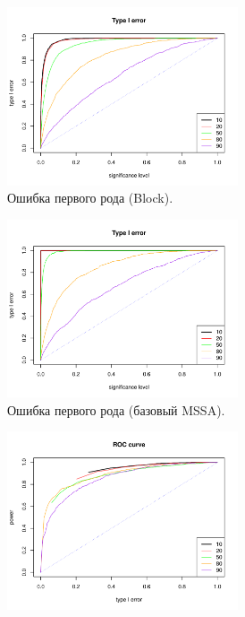 \documentclass[specialist,
substylefile = spbu_report.rtx,
subf,href,colorlinks=true, 12pt]{disser}
\theoremstyle{definition}
\begin{document}
		\begin{figure}
		\captionsetup[subfigure]{justification=Centering}
		\begin{subfigure}[t]{0.45\textwidth}
			\centering
			\includegraphics[width=0.75\textwidth]{type1error_block_fa.pdf}
			\caption{Ошибка первого рода (Block).}
			\label{fig:block_fa_a}
		\end{subfigure}\hspace{\fill}
		\begin{subfigure}[t]{0.45\textwidth}
			\centering
			\includegraphics[width=0.75\textwidth]{type1error_mssa_fa.pdf}
			\caption{Ошибка первого рода (базовый MSSA).}
		\end{subfigure}
		\bigskip
		\begin{subfigure}[t]{0.45\textwidth}
			\centering
			\includegraphics[width=0.75\textwidth]{roc_block_fa.pdf}

\end{subfigure}
\end{figure}
\end{document}
